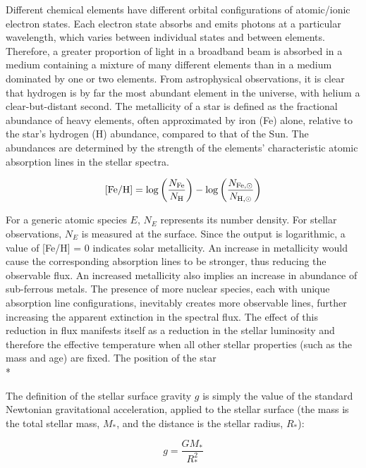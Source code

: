 \documentclass[12pt, a4paper]{report}
\begin{document}
Different chemical elements have different orbital configurations of atomic/ionic electron states. Each electron state absorbs and emits photons at a particular wavelength, which varies between individual states and between elements. Therefore, a greater proportion of light in a broadband beam is absorbed in a medium containing a mixture of many different elements than in a medium dominated by one or two elements. From astrophysical observations, it is clear that hydrogen is by far the most abundant element in the universe, with helium a clear-but-distant second. The metallicity of a star is defined as the fractional abundance of heavy elements, often approximated by iron (Fe) alone, relative to the star's hydrogen (H) abundance, compared to that of the Sun. The abundances are determined by the strength of the elements' characteristic atomic absorption lines in the stellar spectra.

\begin{equation}
\textnormal{[Fe/H]} = \log\left(\frac{N_{\textnormal{Fe}}}{N_{\textnormal{H}}}\right) - \log\left(\frac{N_{\textnormal{Fe},\odot}}{N_{\textnormal{H},\odot}}\right)
\label{FeH_def}
\end{equation}

For a generic atomic species $E$, $N_{E}$ represents its number density. For stellar observations, $N_{E}$ is measured at the surface. Since the output is logarithmic, a value of [Fe/H] = 0 indicates solar metallicity. An increase in metallicity would cause the corresponding absorption lines to be stronger, thus reducing the observable flux. An increased metallicity also implies an increase in abundance of sub-ferrous metals. The presence of more nuclear species, each with unique absorption line configurations, inevitably creates more observable lines, further increasing the apparent extinction in the spectral flux. The effect of this reduction in flux manifests itself as a reduction in the stellar luminosity and therefore the effective temperature when all other stellar properties (such as the mass and age) are fixed. The position of the star\\*

The definition of the stellar surface gravity $g$ is simply the value of the standard Newtonian gravitational acceleration, applied to the stellar surface (the mass is the total stellar mass, $M_{*}$, and the distance is the stellar radius, $R_{*}$):

\begin{equation}
g = \frac{GM_{*}}{R_{*}^{2}}
\label{gravity_def}
\end{equation}
\end{document}
